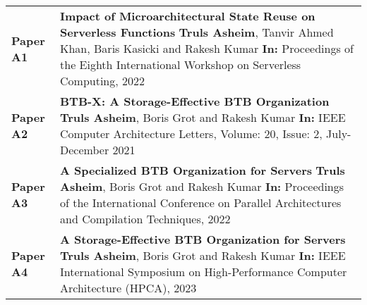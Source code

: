 \documentclass[../main.tex]{subfiles}
\begin{document}
\begin{refsection}
\noindent
\begin{tabular}{lp{}}
  \textbf{Paper A1} & \textbf{Impact of Microarchitectural State Reuse on Serverless Functions} \newline
                      \textbf{Truls Asheim}, Tanvir Ahmed Khan, Baris Kasicki and Rakesh Kumar \newline
                     \textbf{In:} Proceedings of the Eighth International Workshop on Serverless Computing, 2022
                     \vspace*{0.3cm}\\
  \textbf{Paper A2} & \textbf{BTB-X: A Storage-Effective BTB Organization} \newline
                     \textbf{Truls Asheim}, Boris Grot and Rakesh Kumar \newline
                     \textbf{In:} IEEE Computer Architecture Letters, Volume: 20, Issue: 2, July-December 2021
                     \vspace*{0.3cm} \\
\textbf{Paper A3} & \textbf{A Specialized BTB Organization for Servers} \newline
                     \textbf{Truls Asheim}, Boris Grot and Rakesh Kumar \newline
                     \textbf{In:} Proceedings of the International Conference on Parallel Architectures and Compilation Techniques, 2022
                    \vspace*{0.3cm} \\
\textbf{Paper A4} & \textbf{A Storage-Effective BTB Organization for Servers} \newline
                     \textbf{Truls Asheim}, Boris Grot and Rakesh Kumar
                    \newline
                     \textbf{In:} IEEE International Symposium on High-Performance Computer Architecture (HPCA), 2023
                     \vspace*{0.3cm} 

\end{tabular}




\end{refsection}
\end{document}
